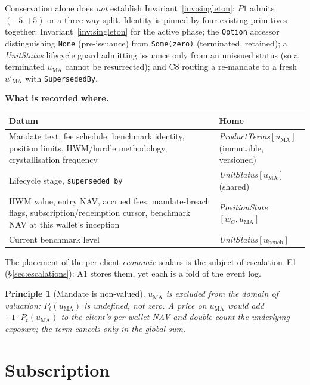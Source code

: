 \documentclass[11pt,a4paper]{article}
\newtheorem{principle}[definition]{Principle}
\begin{document}
\noindent Conservation alone does \emph{not} establish Invariant~\ref{inv:singleton}: $P1$ admits
$(-5,+5)$ or a three-way split. Identity is pinned by four existing primitives together:
Invariant~\ref{inv:singleton} for the active phase; the \texttt{Option} accessor distinguishing
\texttt{None} (pre-issuance) from \texttt{Some(zero)} (terminated, retained); a
\textit{UnitStatus} lifecycle guard admitting issuance only from an unissued status (so a
terminated $u_{\mathrm{MA}}$ cannot be resurrected); and C8 routing a re-mandate to a fresh
$u'_{\mathrm{MA}}$ with \texttt{SupersededBy}.

\noindent\textbf{What is recorded where.}

\begin{longtable}{p{8.4cm}p{6.4cm}}
\toprule
\textbf{Datum} & \textbf{Home} \\
\midrule
Mandate text, fee schedule, benchmark identity, position limits, HWM/hurdle methodology,
crystallisation frequency & \textit{ProductTerms}$[u_{\mathrm{MA}}]$ (immutable, versioned) \\
Lifecycle stage, \texttt{superseded\_by} & \textit{UnitStatus}$[u_{\mathrm{MA}}]$ (shared) \\
HWM value, entry NAV, accrued fees, mandate-breach flags, subscription/redemption cursor,
benchmark NAV at this wallet's inception & \textit{PositionState}$[w_C,u_{\mathrm{MA}}]$ \\
Current benchmark level & \textit{UnitStatus}$[u_{\mathrm{bench}}]$ \\
\bottomrule
\end{longtable}

\noindent The placement of the per-client \emph{economic} scalars is the subject of
escalation~E1 (\S\ref{sec:escalations}): A1 stores them, yet each is a fold of the event log.

\begin{principle}[Mandate is non-valued]
\label{prin:nonvalued}
$u_{\mathrm{MA}}$ is excluded from the domain of valuation: $P_t(u_{\mathrm{MA}})$ is undefined,
not zero. A price on $u_{\mathrm{MA}}$ would add $+1\cdot P_t(u_{\mathrm{MA}})$ to the client's
per-wallet NAV and double-count the underlying exposure; the term cancels only in the global sum.
\end{principle}

\section{Subscription}
\label{sec:subscription}
\end{document}

